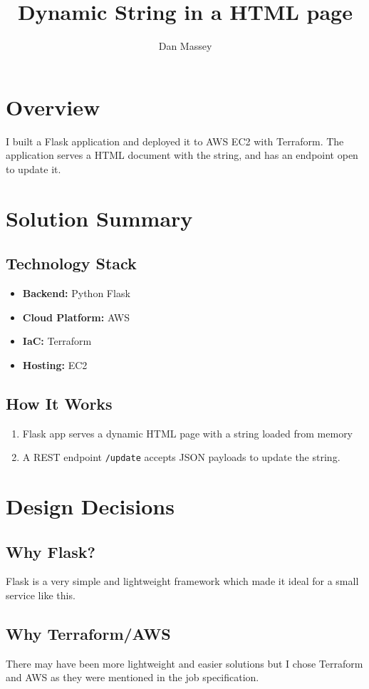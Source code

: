 \documentclass[12pt]{article}
\title{Dynamic String in a HTML page}
\author{Dan Massey}
\begin{document}
\maketitle

\section{Overview}
I built a Flask application and deployed it to AWS EC2 with Terraform. 
The application serves a HTML document with the string, and has an endpoint open to update it. 

\section{Solution Summary}
\subsection*{Technology Stack}
\begin{itemize}
    \item \textbf{Backend:} Python Flask
    \item \textbf{Cloud Platform:} AWS 
    \item \textbf{IaC:} Terraform
    \item \textbf{Hosting:} EC2
\end{itemize}

\subsection*{How It Works}
\begin{enumerate}
    \item Flask app serves a dynamic HTML page with a string loaded from memory
    \item A REST endpoint \texttt{/update} accepts JSON payloads to update the string.
\end{enumerate}

\section{Design Decisions}
\subsection*{Why Flask?}
Flask is a very simple and lightweight framework which made it ideal for a small service like this. 

\subsection*{Why Terraform/AWS}
There may have been more lightweight and easier solutions but I chose Terraform and AWS as they were mentioned in the job specification. 
\end{document}
